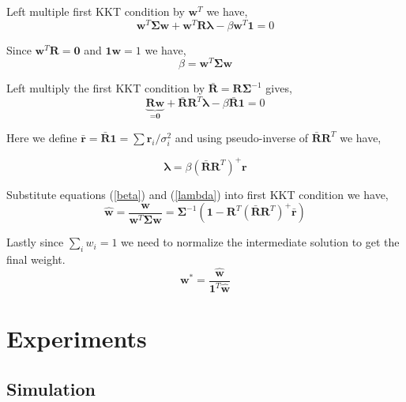 \documentclass[conference]{IEEEtran}
\begin{document}
Left multiple first KKT condition by $\textbf{w}^T$ we have,
\begin{equation}
\textbf{w}^T\bm{\Sigma}\textbf{w} + \textbf{w}^T\textbf{R}\bm{\lambda} - \beta \textbf{w}^T\textbf{1} = 0
\end{equation}

Since $\textbf{w}^T\textbf{R} = \textbf{0}$ and $\textbf{1}\textbf{w} = 1$ we have,
\begin{equation}\label{beta}
    \beta = \textbf{w}^T\bm{\Sigma}\textbf{w}
\end{equation}

Left multiply the first KKT condition by $\bar{\textbf{R}} = \textbf{R}\bm{\Sigma}^{-1}$ gives,
\begin{equation}
\underbrace{\textbf{R}\textbf{w}}_{=\textbf{0}} + \bar{\textbf{R}}\textbf{R}^T\bm{\lambda} - \beta\bar{\textbf{R}}\textbf{1} = 0
\end{equation}

Here we define $\bar{\textbf{r}} = \bar{\textbf{R}}\textbf{1} = \sum{\textbf{r}_i / \sigma_i^2}$ and using pseudo-inverse of $\bar{\textbf{R}}\textbf{R}^T$ we have,

\begin{equation}\label{lambda}
    \bm{\lambda} = \beta \left(\bar{\textbf{R}}\textbf{R}^T\right)^{+} \textbf{r}
\end{equation}

Substitute equations (\ref{beta}) and (\ref{lambda}) into first KKT condition we have,
\begin{equation}
    \hat{\textbf{w}} = \frac{\textbf{w}}{\textbf{w}^T\bm{\Sigma}\textbf{w}} = \bm{\Sigma}^{-1} \left( \textbf{1} - \textbf{R}^T \left(\bar{\textbf{R}}\textbf{R}^T\right)^{+} \bar{\textbf{r}} \right)
\end{equation}

Lastly since $\sum_i{w_i} = 1$ we need to normalize the intermediate solution to get the final weight.
\begin{equation}
    \textbf{w}^* = \frac{\hat{\textbf{w}}}{\textbf{1}^T \hat{\textbf{w}}}
\end{equation}

\section{Experiments}

\subsection{Simulation}
\end{document}
